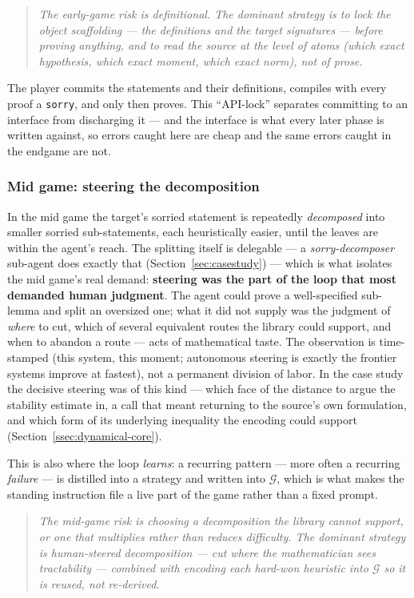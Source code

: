 \documentclass[11pt]{article}
\theoremstyle{plain}
\theoremstyle{definition}
\theoremstyle{remark}
\newcommand{\lean}[1]{\texttt{#1}}
\begin{document}
\begin{quote}\itshape
The early-game risk is definitional. The dominant strategy is to lock the
object scaffolding --- the definitions and the target signatures --- before
proving anything, and to read the source at the level of atoms (which exact
hypothesis, which exact moment, which exact norm), not of prose.
\end{quote}

The player commits the statements and their definitions, compiles with every proof
a \lean{sorry}, and only then proves. This ``API-lock'' separates committing to an
interface from discharging it --- and the interface is what every later phase is
written against, so errors caught here are cheap and the same errors caught in the
endgame are not.

\subsubsection{Mid game: steering the decomposition}
In the mid game the target's sorried statement is repeatedly \emph{decomposed} into
smaller sorried sub-statements, each heuristically easier, until the leaves are
within the agent's reach. The splitting itself is delegable --- a
\emph{sorry-decomposer} sub-agent does exactly that (Section~\ref{sec:casestudy})
--- which is what isolates the mid game's real demand: \textbf{steering was the
part of the loop that most demanded human judgment}. The agent
could prove a well-specified sub-lemma and split an oversized one; what it did not
supply was the judgment of \emph{where} to cut, which of several equivalent routes
the library could support, and when to abandon a route --- acts of mathematical
taste. The observation is time-stamped (this system, this moment; autonomous
steering is exactly the frontier systems improve at fastest), not a permanent
division of labor. In the case study the decisive steering was of this kind ---
which face of the distance to argue the stability estimate in, a call that meant
returning to the source's own formulation, and which form of its underlying
inequality the encoding could support (Section~\ref{ssec:dynamical-core}).

This is also where the loop \emph{learns}: a recurring pattern --- more often a
recurring \emph{failure} --- is distilled into a strategy and written into
$\mathcal{G}$, which is what makes the standing instruction file a live part of the
game rather than a fixed prompt.

\begin{quote}\itshape
The mid-game risk is choosing a decomposition the library cannot support, or one
that multiplies rather than reduces difficulty. The dominant strategy is
human-steered decomposition --- cut where the mathematician sees tractability ---
combined with encoding each hard-won heuristic into $\mathcal{G}$ so it is reused,
not re-derived.
\end{quote}
\end{document}
